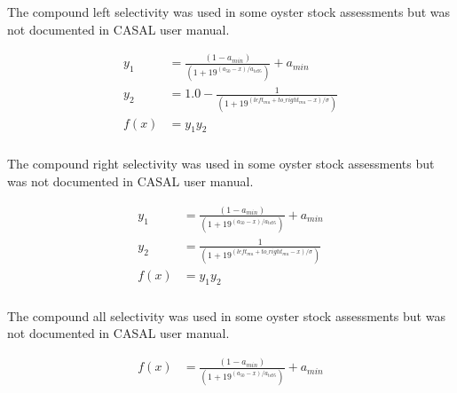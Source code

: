\subsubsection[Compound-Left]{}\label{sec:Selectivity-CompoundLeft}

The compound left selectivity was used in some oyster stock assessments but was not documented in CASAL user manual.

\begin{align*}
y_1 & = \frac{\left(1 - a_{min}\right)}{\left(1 + 19^{(a_{50} - x)/a_{to95}}\right)}  + a_{min}\\
y_2 & = 1.0 - \frac{1}{\left(1 + 19^{(left_{mu} + to\_right_{mu} - x)/\sigma}\right)}\\
f(x)  &= 	y_1 y_2
\end{align*}


\subsubsection[Compound-Right]{}\label{sec:Selectivity-CompoundRight}

The compound right selectivity was used in some oyster stock assessments but was not documented in CASAL user manual.

\begin{align*}
y_1 & = \frac{\left(1 - a_{min}\right)}{\left(1 + 19^{(a_{50} - x)/a_{to95}}\right)}  + a_{min}\\
y_2 & = \frac{1}{\left(1 + 19^{(left_{mu} + to\_right_{mu} - x)/\sigma}\right)}\\
f(x)  &= 	y_1 y_2
\end{align*}

\subsubsection[Compound-All]{}\label{sec:Selectivity-CompoundAll}

The compound all selectivity was used in some oyster stock assessments but was not documented in CASAL user manual.

\begin{align*}
f(x)  & = \frac{\left(1 - a_{min}\right)}{\left(1 + 19^{(a_{50} - x)/a_{to95}}\right)}  + a_{min}
\end{align*}


\subsubsection[Compound-Middle]{}\label{sec:Selectivity-CompoundMidde}

